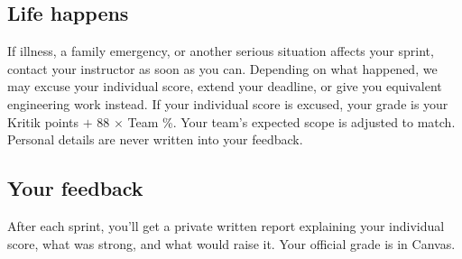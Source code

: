 \documentclass[11pt]{article}
\begin{document}
\subsection*{Life happens}
If illness, a family emergency, or another serious situation affects your sprint, contact your instructor as soon as you can. Depending on what happened, we may excuse your individual score, extend your deadline, or give you equivalent engineering work instead. If your individual score is excused, your grade is your Kritik points $+$ 88 $\times$ Team \%. Your team's expected scope is adjusted to match. Personal details are never written into your feedback.

\subsection*{Your feedback}
After each sprint, you'll get a private written report explaining your individual score, what was strong, and what would raise it. Your official grade is in Canvas.
\end{document}

